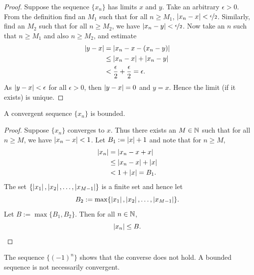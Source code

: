 \begin{proof}
Suppose the sequence $\{ x_n \}$ has limits $x$ and $y$.
Take an arbitrary $\epsilon > 0$.
From the definition find an $M_1$ such that for all $n \geq M_1$,
$\left\lvert {x_n-x} \right\rvert < \nicefrac{\epsilon}{2}$.  Similarly, find an $M_2$
such that for all $n \geq M_2$, we have
$\left\lvert {x_n-y} \right\rvert < \nicefrac{\epsilon}{2}$.
Now take an $n$ such that $n \geq M_1$ and also $n \geq M_2$, and estimate
\begin{equation*}
\begin{split}
\left\lvert {y-x} \right\rvert
& =
\left\lvert {x_n-x - (x_n -y)} \right\rvert \\
& \leq
\left\lvert {x_n-x} \right\rvert + \left\lvert {x_n -y} \right\rvert \\
& <
\frac{\epsilon}{2} + \frac{\epsilon}{2} = \epsilon .
\end{split}
\end{equation*}
As $\left\lvert {y-x} \right\rvert < \epsilon$ for all $\epsilon > 0$, then $\left\lvert {y-x} \right\rvert = 0$
and $y=x$.  Hence the limit (if it exists) is unique.
\end{proof}

\begin{prop}
A convergent sequence $\{ x_n \}$ is bounded.
\end{prop}

\begin{proof}
Suppose $\{ x_n \}$ converges to $x$.  Thus there exists an $M \in {\mathbb{N}}$
such that for all $n \geq M$, we have
$\left\lvert {x_n - x} \right\rvert < 1$.  Let $B_1 := \left\lvert {x} \right\rvert+1$ and note that for $n \geq M$,
\begin{equation*}
\begin{split}
\left\lvert {x_n} \right\rvert & = \left\lvert {x_n - x + x} \right\rvert
\\
& \leq \left\lvert {x_n - x} \right\rvert + \left\lvert {x} \right\rvert
\\
& < 1 + \left\lvert {x} \right\rvert = B_1 .
\end{split}
\end{equation*}
The set $\{ \left\lvert {x_1} \right\rvert, \left\lvert {x_2} \right\rvert, \ldots, \left\lvert {x_{M-1}} \right\rvert \}$
is a finite set and hence let
\begin{equation*}
B_2 := \max \{ \left\lvert {x_1} \right\rvert, \left\lvert {x_2} \right\rvert, \ldots, \left\lvert {x_{M-1}} \right\rvert \} .
\end{equation*}
Let $B := \max \{ B_1, B_2 \}$.  Then for all $n \in {\mathbb{N}}$,
\begin{equation*}
\left\lvert {x_n} \right\rvert \leq B. \qedhere
\end{equation*}
\end{proof}

The sequence $\{ {(-1)}^n \}$ shows that the converse
does not hold.  A bounded sequence is not necessarily convergent.

